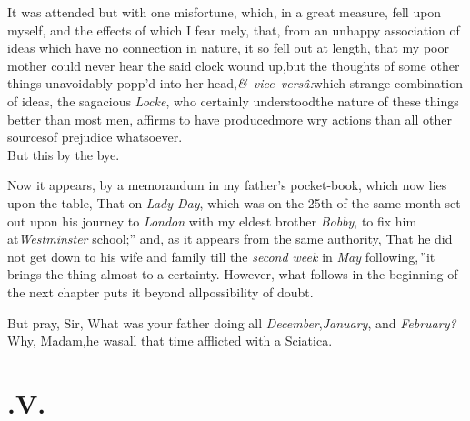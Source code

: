 \documentclass{article}
\begin{document}
It was attended but with one misfortune, which, in a great
measure, fell upon myself, and the effects of which I fear\break
{}
mely, that, from an unhappy association
of ideas which have no connection in nature, it so fell out at
length, that my poor mother could never hear the said clock wound
up,\tsk but the thoughts of some other things unavoidably
popp’d into her head,\tsk \hbox{{\small\itshape\egb\&} \textit{vice
versâ:}}\tsk which strange combination of ideas, the
sagacious \textit{Locke}, who certainly understood\break the nature of
these things better than most men, affirms to have produced\break more
wry actions than all other sources\break of prejudice whatsoever.\\
\indent But this by the bye.\hfill{}

Now it appears, by a memorandum in my father’s pocket-book, which now lies upon
the table, \lqq That on \textit{Lady-Day}, which was on the 25th of
the same month 
set out upon his journey to \textit{London} with my eldest brother
\textit{Bobby}, to fix him at\break\textit{Westminster} school;” and,
as it appears from the same authority, \lqq That he did not get
down to his wife and family till the \textit{second week} in
\textit{May} following,\,”\tsk it brings the thing almost to a
certainty.\break
However, what follows in the beginning of the next
chapter puts it beyond all\break possibility of doubt.

\tsh But pray, Sir, What was your father doing
all \textit{December},\tsk\textit{January}, and
\textit{February?}\tsh Why, Madam,\tsk he was\break all that
time afflicted with a Sciatica.
\hfill{}

\null
\section{.\enspace V.}
\end{document}
